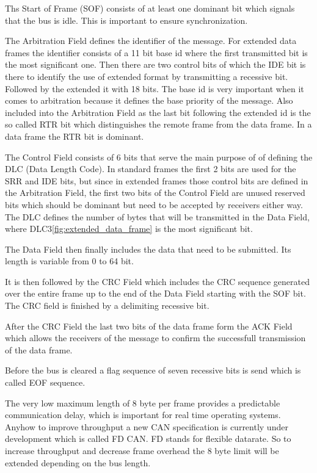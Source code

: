 	Ths Start of Frame (SOF) consists of at least one dominant bit which signals
	that the bus is idle. This is important to ensure synchronization.
	
	The Arbitration Field defines the identifier of the message. For extended data
	frames the identifier consists of a 11 bit base id where the first transmitted
	bit is the most significant one. Then there are two control bits of which the
	IDE bit is there to identify the use of extended format by transmitting a
	recessive bit. Followed by the extended it with 18 bits. The base id is very
	important when it comes to arbitration because it defines the base priority of
	the message.
	Also included into the Arbitration Field as the last bit following the extended
	id is the so called RTR bit which distinguishes the remote frame from the data
	frame. In a data frame the RTR bit is dominant.
	
	The Control Field consists of 6 bits that serve the main purpose of of defining
	the DLC (Data Length Code). In standard frames the first 2 bits are used for
	the SRR and IDE bits, but since in extended frames those control bits are
	defined in the Arbitration Field, the first two bits of the Control Field are
	unused reserved bits which should be dominant but need to be accepted by
	receivers either way. The DLC defines the number of bytes that will be
	transmitted in the Data Field, where DLC3\autoref{fig:extended_data_frame} is
	the most significant bit.
	
	The Data Field then finally includes the data that need to be submitted. Its
	length is variable from 0 to 64 bit. 
	
	It is then followed by the CRC Field which includes the CRC sequence generated
	over the entire frame up to the end of the Data Field starting with the SOF
	bit. The CRC field is finished by a delimiting recessive bit. 
	
	After the CRC Field the last two bits of the data frame form the ACK Field
	which allows the receivers of the message to confirm the
	successfull transmission of the data frame.
	
	Before the bus is cleared a flag sequence of seven recessive bits is send which
	is called EOF sequence.
	
	The very low maximum length of 8 byte per frame provides a predictable
	communication delay, which is important for real time operating systems. Anyhow
	to improve throughput a new CAN specification is currently under development
	which is called FD CAN. FD stands for flexible datarate. So to increase
	throughput and decrease frame overhead the 8 byte limit will be extended
	depending on the bus length.
	 
